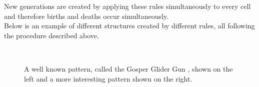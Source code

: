 \documentclass[a4paper,10pt]{article}
\begin{document}
New generations are created by applying these rules simultaneously to every cell and therefore births and deaths occur simultaneously. \\

Below is an example of different structures created by different rules, all following the procedure described above.

\begin{figure}[H]
\centering
\mbox{ \quad
{}} \caption{A well known pattern, called the Gosper Glider Gun \cite{n}, shown on the left and a more interesting pattern \cite{p} shown on the right.}
\end{figure}
\end{document}
